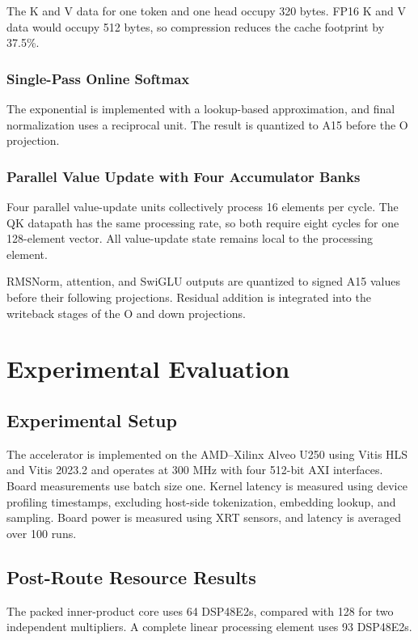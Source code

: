 \documentclass[conference]{IEEEtran}
\begin{document}
The K and V data for one token and one head occupy 320 bytes. FP16 K and V data
would occupy 512 bytes, so compression reduces the cache footprint by 37.5\%.

\subsubsection{Single-Pass Online Softmax}

The exponential is implemented with a lookup-based approximation, and final
normalization uses a reciprocal unit. The result is quantized to A15 before the
O projection.

\subsubsection{Parallel Value Update with Four Accumulator Banks}

Four parallel value-update units collectively process 16 elements per cycle.
The QK datapath has the same processing rate, so both require eight cycles for
one 128-element vector. All value-update state remains local to the processing
element.

RMSNorm, attention, and SwiGLU outputs are quantized to signed A15 values before
their following projections. Residual addition is integrated into the
writeback stages of the O and down projections.

\section{Experimental Evaluation}

\subsection{Experimental Setup}

The accelerator is implemented on the AMD--Xilinx Alveo U250 using Vitis HLS
and Vitis 2023.2 and operates at 300 MHz with four 512-bit AXI interfaces.
Board measurements use batch size one. Kernel latency is measured using device
profiling timestamps, excluding host-side tokenization, embedding lookup, and
sampling. Board power is measured using XRT sensors, and latency is averaged
over 100 runs.

\subsection{Post-Route Resource Results}

The packed inner-product core uses 64 DSP48E2s, compared with 128 for two
independent multipliers. A complete linear processing element uses 93 DSP48E2s.
\end{document}
